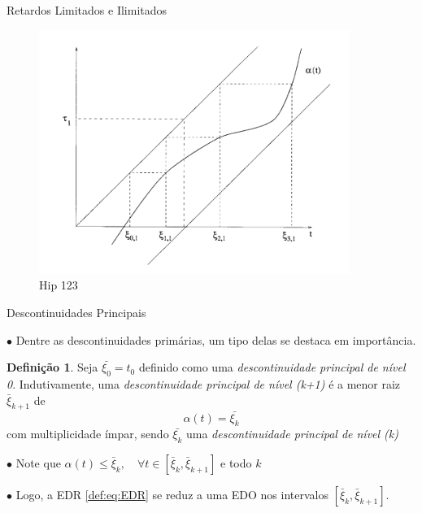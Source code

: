 \documentclass{beamer}
\theoremstyle{plain}
\theoremstyle{definition}
\newtheorem{defi}{Definição}
\begin{document}

\begin{frame}{Retardos Limitados e Ilimitados}

    \begin{figure}
        \begin{center}
            \includegraphics[width=0.9\textwidth, height=0.7\textheight]{hip123.png}
        \end{center}
        \caption{Hip 123}\label{fig:Desaparecimento do Retardo}
    \end{figure}

\end{frame}




\begin{frame}{Descontinuidades Principais}

    $\bullet$ Dentre as descontinuidades primárias, um tipo delas se destaca em importância.

    \begin{defi}
        \label{chap2:def:principal_descontinuity}
    Seja $\bar{\xi_0} = t_0$ definido como uma \textit{descontinuidade principal de nível 0}. Indutivamente, uma \textit{descontinuidade principal de nível (k+1)} é a menor raiz $\bar{\xi}_{k+1}$ de 
        \[
            \alpha(t) = \bar{\xi_k}
        \]
        com multiplicidade ímpar, sendo $\bar{\xi_k}$ uma \textit{descontinuidade principal de nível (k)}
    \end{defi}


    $\bullet$ Note que $ \alpha(t) \leq \bar{\xi}_{k}, \quad \forall t \in\left[\bar{\xi}_{k}, \bar{\xi}_{k+1}\right] $ e todo $k$

    $\bullet$ Logo, a EDR \eqref{def:eq:EDR} se reduz a uma EDO nos intervalos $\left[\bar{\xi}_{k}, \bar{\xi}_{k+1}\right]$. 

\end{frame}
\end{document}
